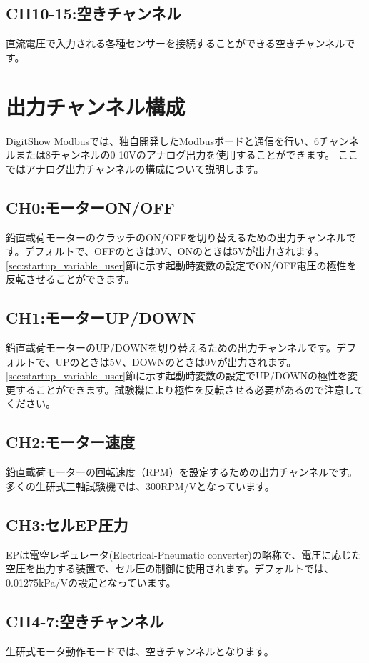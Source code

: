 \subsection{CH10-15:空きチャンネル}
直流電圧で入力される各種センサーを接続することができる空きチャンネルです。

\section{出力チャンネル構成}
\label{sec:output_channel}
DigitShow Modbusでは、独自開発したModbusボードと通信を行い、6チャンネルまたは8チャンネルの0-10Vのアナログ出力を使用することができます。
ここではアナログ出力チャンネルの構成について説明します。

\subsection{CH0:モーターON/OFF}
鉛直載荷モーターのクラッチのON/OFFを切り替えるための出力チャンネルです。デフォルトで、OFFのときは0V、ONのときは5Vが出力されます。\ref{sec:startup_variable_user}節に示す起動時変数の設定でON/OFF電圧の極性を反転させることができます。

\subsection{CH1:モーターUP/DOWN}
鉛直載荷モーターのUP/DOWNを切り替えるための出力チャンネルです。デフォルトで、UPのときは5V、DOWNのときは0Vが出力されます。\ref{sec:startup_variable_user}節に示す起動時変数の設定でUP/DOWNの極性を変更することができます。試験機により極性を反転させる必要があるので注意してください。

\subsection{CH2:モーター速度}
鉛直載荷モーターの回転速度（RPM）を設定するための出力チャンネルです。多くの生研式三軸試験機では、300RPM/Vとなっています。

\subsection{CH3:セルEP圧力}
EPは電空レギュレータ(Electrical-Pneumatic converter)の略称で、電圧に応じた空圧を出力する装置で、セル圧の制御に使用されます。デフォルトでは、0.01275kPa/Vの設定となっています。

\subsection{CH4-7:空きチャンネル}
生研式モータ動作モードでは、空きチャンネルとなります。

